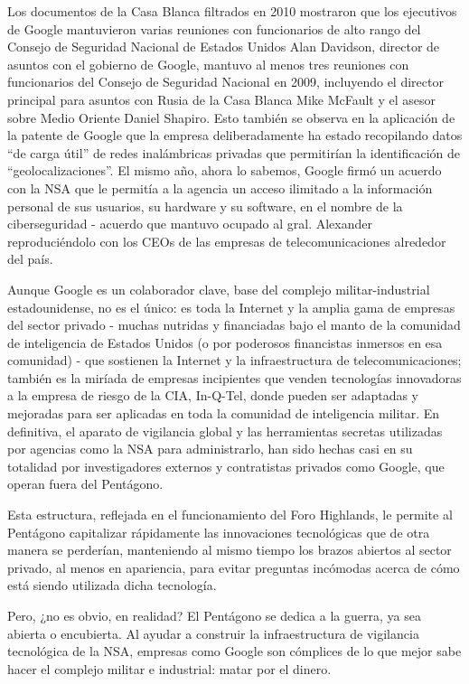 \documentclass[10pt,a5paper,twoside,spanish,]{book}
\begin{document}
Los documentos de la Casa Blanca filtrados en 2010 mostraron que los
ejecutivos de Google mantuvieron varias reuniones con funcionarios de
alto rango del Consejo de Seguridad Nacional de Estados Unidos Alan
Davidson, director de asuntos con el gobierno de Google, mantuvo al
menos tres reuniones con funcionarios del Consejo de Seguridad Nacional
en 2009, incluyendo el director principal para asuntos con Rusia de la
Casa Blanca Mike McFault y el asesor sobre Medio Oriente Daniel Shapiro.
Esto también se observa en la aplicación de la patente de Google que la
empresa deliberadamente ha estado recopilando datos ``de carga útil'' de
redes inalámbricas privadas que permitirían la identificación de
``geolocalizaciones''. El mismo año, ahora lo sabemos, Google firmó un
acuerdo con la NSA que le permitía a la agencia un acceso ilimitado a la
información personal de sus usuarios, su hardware y su software, en el
nombre de la ciberseguridad - acuerdo que mantuvo ocupado al gral.
Alexander reproduciéndolo con los CEOs de las empresas de
telecomunicaciones alrededor del país.

Aunque Google es un colaborador clave, base del complejo
militar-industrial estadounidense, no es el único: es toda la Internet y
la amplia gama de empresas del sector privado - muchas nutridas y
financiadas bajo el manto de la comunidad de inteligencia de Estados
Unidos (o por poderosos financistas inmersos en esa comunidad) - que
sostienen la Internet y la infraestructura de telecomunicaciones;
también es la miríada de empresas incipientes que venden tecnologías
innovadoras a la empresa de riesgo de la CIA, In-Q-Tel, donde pueden ser
adaptadas y mejoradas para ser aplicadas en toda la comunidad de
inteligencia militar. En definitiva, el aparato de vigilancia global y
las herramientas secretas utilizadas por agencias como la NSA para
administrarlo, han sido hechas casi en su totalidad por investigadores
externos y contratistas privados como Google, que operan fuera del
Pentágono.

Esta estructura, reflejada en el funcionamiento del Foro Highlands, le
permite al Pentágono capitalizar rápidamente las innovaciones
tecnológicas que de otra manera se perderían, manteniendo al mismo
tiempo los brazos abiertos al sector privado, al menos en apariencia,
para evitar preguntas incómodas acerca de cómo está siendo utilizada
dicha tecnología.

Pero, ¿no es obvio, en realidad? El Pentágono se dedica a la guerra, ya
sea abierta o encubierta. Al ayudar a construir la infraestructura de
vigilancia tecnológica de la NSA, empresas como Google son cómplices de
lo que mejor sabe hacer el complejo militar e industrial: matar por el
dinero.
\end{document}
